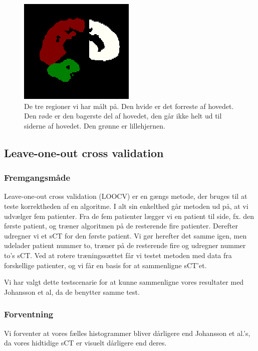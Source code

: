 \begin{figure}[H]
    \centering
   \includegraphics[width=.5\textwidth]{billeder/masks.png}
   \caption{De tre regioner vi har målt på. Den hvide er det forreste af hovedet. Den røde er den bagerste del af hovedet, den går ikke helt ud til siderne af hovedet. Den grønne er lillehjernen.}
   \label{masks}
\end{figure}

\subsection{Leave-one-out cross validation}
\subsubsection{Fremgangsmåde}

Leave-one-out cross validation (LOOCV) er en gængs metode, der bruges til
at teste korrektheden af en algoritme. I alt sin enkelthed går metoden
ud på, at vi udvælger fem patienter. Fra de fem patienter lægger vi en
patient til side, fx. den første patient, og træner algoritmen på de
resterende fire patienter. Derefter udregner vi et sCT for den første
patient. Vi gør herefter det samme igen, men udelader patient nummer to,
træner på de resterende fire og udregner nummer to's sCT.  Ved at
rotere træningssættet får vi testet metoden med data fra forskellige
patienter, og vi får en basis for at sammenligne sCT'et.

Vi har valgt dette testscenarie for at kunne sammenligne vores resultater med Johansson et al, da de benytter samme test.

\subsubsection{Forventning}
Vi forventer at vores fælles histogrammer bliver dårligere end Johansson et al.'s, da vores hidtidige sCT er visuelt dårligere end deres.


